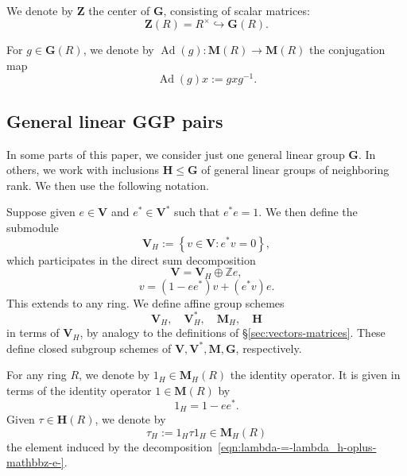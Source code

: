 \documentclass[reqno]{amsart}
\DeclareMathOperator{\Ad}{Ad}
\theoremstyle{plain} \newtheorem{theorem} {Theorem} \newtheorem{conjecture} {Conjecture} \newtheorem{corollary} [theorem] {Corollary} \newtheorem{proposition} [theorem] {Proposition} \newtheorem{fact} [theorem] {Fact}
\theoremstyle{definition} \newtheorem{definition} [theorem] {Definition}
\theoremstyle{itplain} %
\begin{document}
We denote by $\mathbf{Z}$ the center of $\mathbf{G}$, consisting of scalar matrices:
\begin{equation*}
  \mathbf{Z}(R) = R^\times \hookrightarrow \mathbf{G}(R).
\end{equation*}

For $g \in \mathbf{G}(R)$, we denote by $\Ad(g) : \mathbf{M}(R) \rightarrow \mathbf{M}(R)$ the conjugation map
\begin{equation*}
  \Ad(g) x := g x g ^{-1}.
\end{equation*}

\subsection{General linear GGP pairs}\label{sec:general-linear-ggp-pairs}
In some parts of this paper, we consider just one general linear group $\mathbf{G}$.  In others, we work with inclusions $\mathbf{H} \leq \mathbf{G}$ of general linear groups of neighboring rank.  We then use the following notation.

Suppose given $e \in \mathbf{V}$ and $e^* \in \mathbf{V}^*$ such that $e^* e= 1$.  We then define the submodule
\begin{equation*}
  \mathbf{V}_H := \left\{ v \in \mathbf{V} : e^* v = 0 \right\},
\end{equation*}
which participates in the direct sum decomposition
\begin{equation}\label{eqn:lambda-=-lambda_h-oplus-mathbbz-e-}
  \mathbf{V} = \mathbf{V}_H \oplus \mathbb{Z} e,
\end{equation}
\begin{equation*}
  v = (1 -  e e^*) v + (e^* v) e.
\end{equation*}
This extends to any ring.  We define affine group schemes
\begin{equation*}
  \mathbf{V}_H, \quad \mathbf{V}_H^*, \quad \mathbf{M}_H, \quad \mathbf{H}
\end{equation*}
in terms of $\mathbf{V}_H$, by analogy to the definitions of \S\ref{sec:vectors-matrices}.  These define closed subgroup schemes of $\mathbf{V}, \mathbf{V}^*, \mathbf{M}, \mathbf{G}$, respectively.

For any ring $R$, we denote by $1_H \in \mathbf{M}_H(R)$ the identity operator.  It is given in terms of the identity operator $1 \in \mathbf{M}(R)$ by
\begin{equation*}
  1_H = 1 - e e^*.
\end{equation*}
Given $\tau \in \mathbf{H}(R)$, we denote by
\begin{equation*}
  \tau_H := 1_H \tau 1_H \in \mathbf{M}_H(R)
\end{equation*}
the element induced by the decomposition~\eqref{eqn:lambda-=-lambda_h-oplus-mathbbz-e-}.
\end{document}
